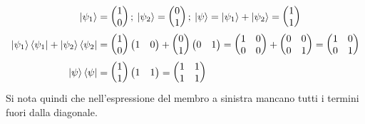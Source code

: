 \documentclass[../../FisicaTeorica.tex]{subfiles}
\begin{document}
\begin{align*}
\Ket{\psi_1}&=\begin{pmatrix}
1\\
0
\end{pmatrix};\>\Ket{\psi_2} = \begin{pmatrix}
0\\
1
\end{pmatrix};\>\Ket{\psi}=\Ket{\psi_1}+\Ket{\psi_2}=\begin{pmatrix}
1\\
1
\end{pmatrix}\\
\Ket{\psi_1}\Bra{\psi_1} + \Ket{\psi_2}\Bra{\psi_2} &= 
\begin{pmatrix}
1\\
0
\end{pmatrix}
\begin{pmatrix}
1 & 0
\end{pmatrix}
+
\begin{pmatrix}
0\\
1
\end{pmatrix}
\begin{pmatrix}
0 & 1
\end{pmatrix} =
\begin{pmatrix}
1 & 0\\
0 & 0
\end{pmatrix}
+ \begin{pmatrix}
0 & 0\\
0 & 1
\end{pmatrix}
= \begin{pmatrix}
1 & 0\\
0 & 1
\end{pmatrix}\\
\Ket{\psi}\Bra{\psi} &=
\begin{pmatrix}
1\\
1
\end{pmatrix}
\begin{pmatrix}
1 & 1
\end{pmatrix}
=
\begin{pmatrix}
1 & 1\\
1 & 1
\end{pmatrix}
\end{align*}
Si nota quindi che nell'espressione del membro a sinistra mancano tutti i termini fuori dalla diagonale.\\
\end{document}
